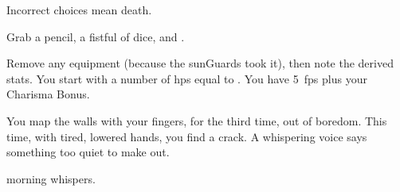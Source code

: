 \documentclass[10pt,twoside]{book}
\begin{document}
%
  {%
    \vfill\null%
    \ast\tiny Incorrect choices mean death.%
  }

\noindent
Grab a pencil, a fistful of dice, and .

Remove any equipment (because the \glspl{sunGuard} took it), then note the derived stats.
You start with a number of \glspl{hp} equal to .
You have 5~\glspl{fp} plus your Charisma Bonus.

\pagebreak

\pagestyle{minizine}


You map the walls with your fingers, for the third time, out of boredom.
This time, with tired, lowered hands, you find a crack.
A whispering voice says something too quiet to make out.

\begin{selectPath}
  {}%
  {morning}
  {}%
  {whispers}.
\end{selectPath}
\end{document}
